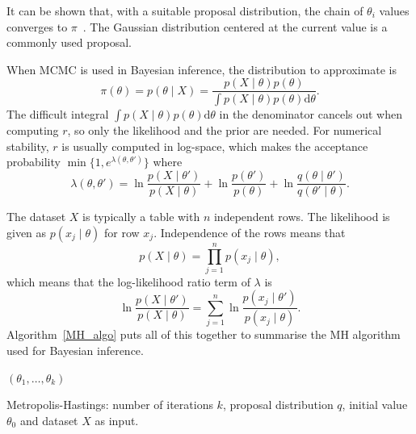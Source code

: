 \documentclass[english,twoside,openright]{HYgraduMLDS}
\newcommand{\dx}{\mathrm{d}}
\begin{document}
It can be shown that, with a suitable proposal distribution, the chain of 
\(\theta_i\) values converges to \(\pi\)~\cite{Has70}. The Gaussian distribution centered
at the current value is a commonly used proposal.

When MCMC is used in Bayesian inference, the distribution to approximate is 
\[
    \pi(\theta) = p(\theta \mid X) = \frac{p(X \mid \theta)p(\theta)}
    {\int p(X\mid \theta)p(\theta)\dx\theta}.
\]
The difficult integral \(\int p(X\mid \theta)p(\theta)\dx\theta\) in the denominator
cancels out when computing \(r\), so only the likelihood and the prior are needed. 
For numerical stability, \(r\) is usually computed in 
log-space, which makes the acceptance probability
\(\min\{1, e^{\lambda(\theta, \theta')}\}\) where 
\begin{equation}\label{lambda_equation}
    \lambda(\theta, \theta') = \ln \frac{p(X\mid \theta')}{p(X\mid \theta)}
    + \ln \frac{p(\theta')}{p(\theta)}
    + \ln \frac{q(\theta\mid \theta')}{q(\theta'\mid \theta)}.
\end{equation}

The dataset \(X\) is typically a table with \(n\) independent rows.
The likelihood is given as \(p(x_j\mid \theta)\)
for row \(x_j\). Independence of the rows means that 
\[
    p(X\mid \theta) = \prod_{j=1}^n p(x_j\mid \theta),
\]
which means that the log-likelihood ratio term of \(\lambda\) is
\[
    \ln \frac{p(X\mid \theta')}{p(X\mid \theta)}
    = \sum_{j=1}^n \ln\frac{p(x_j\mid \theta')}{p(x_j\mid \theta)}.
\]
Algorithm~\ref{MH_algo} puts all of this together to summarise the MH 
algorithm used for Bayesian inference.

\begin{algorithm}[H]\label{MH_algo}
    \SetAlgoLined
    \Return \((\theta_1, \dotsc, \theta_k)\)
    \caption{
        Metropolis-Hastings: number of iterations \(k\), proposal 
        distribution \(q\), initial value \(\theta_0\) and
        dataset \(X\) as input.
    }
\end{algorithm}
\end{document}

